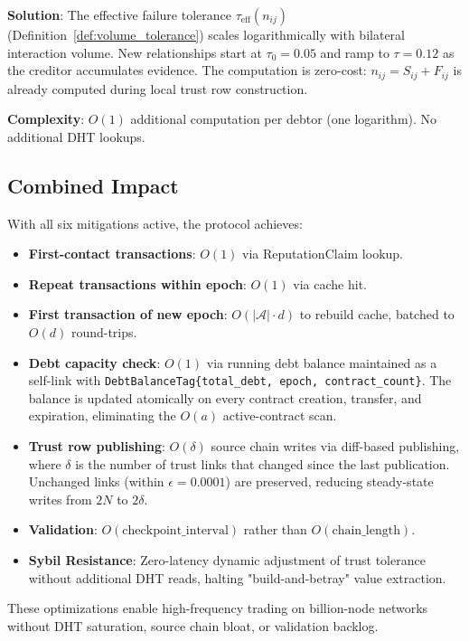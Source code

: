 \documentclass[11pt]{article}
\begin{document}
\textbf{Solution}: The effective failure tolerance $\tau_{\text{eff}}(n_{ij})$ (Definition~\ref{def:volume_tolerance}) scales logarithmically with bilateral interaction volume. New relationships start at $\tau_0 = 0.05$ and ramp to $\tau = 0.12$ as the creditor accumulates evidence. The computation is zero-cost: $n_{ij} = S_{ij} + F_{ij}$ is already computed during local trust row construction.

\textbf{Complexity}: $O(1)$ additional computation per debtor (one logarithm). No additional DHT lookups.

\subsection{Combined Impact}

With all six mitigations active, the protocol achieves:
\begin{itemize}
    \item \textbf{First-contact transactions}: $O(1)$ via ReputationClaim lookup.
    \item \textbf{Repeat transactions within epoch}: $O(1)$ via cache hit.
    \item \textbf{First transaction of new epoch}: $O(|\mathcal{A}| \cdot d)$ to rebuild cache, batched to $O(d)$ round-trips.
    \item \textbf{Debt capacity check}: $O(1)$ via running debt balance maintained as a self-link with \texttt{Debt\-Balance\-Tag\{total\_debt, epoch, contract\_count\}}. The balance is updated atomically on every contract creation, transfer, and expiration, eliminating the $O(a)$ active-contract scan.
    \item \textbf{Trust row publishing}: $O(\delta)$ source chain writes via diff-based publishing, where $\delta$ is the number of trust links that changed since the last publication. Unchanged links (within $\epsilon = 0.0001$) are preserved, reducing steady-state writes from $2N$ to $2\delta$.
    \item \textbf{Validation}: $O(\text{checkpoint\_interval})$ rather than $O(\text{chain\_length})$.
    \item \textbf{Sybil Resistance}: Zero-latency dynamic adjustment of trust tolerance without additional DHT reads, halting "build-and-betray" value extraction.
\end{itemize}

These optimizations enable high-frequency trading on billion-node networks without DHT saturation, source chain bloat, or validation backlog.
\end{document}
